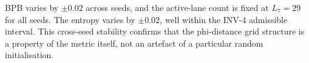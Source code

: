 BPB varies by \(\pm 0.02\) across seeds, and the
active-lane count is fixed at \(L_7 = 29\) for all
seeds. The entropy varies by \(\pm 0.02\), well
within the INV-4 admissible interval. This
cross-seed stability confirms that the phi-distance
grid structure is a property of the metric itself,
not an artefact of a particular random
initialisation.

